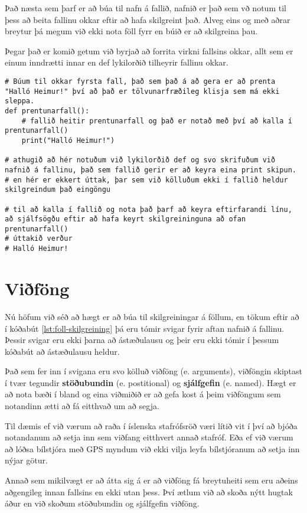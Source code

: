 Það næsta sem þarf er að búa til nafn á fallið, nafnið er það sem vð notum til þess að beita fallinu okkar eftir að hafa skilgreint það.
Alveg eins og með aðrar breytur þá megum við ekki nota föll fyrr en búið er að skilgreina þau.

Þegar það er komið getum við byrjað að forrita virkni fallsins okkar, allt sem er einum inndrætti innar en def lykilorðið tilheyrir fallinu okkar.


\begin{lstlisting}[caption=Föll skilgreind, label=lst:foll-skilgreining]
# Búum til okkar fyrsta fall, það sem það á að gera er að prenta "Halló Heimur!" því að það er tölvunarfræðileg klisja sem má ekki sleppa.
def prentunarfall():
	# fallið heitir prentunarfall og það er notað með því að kalla í prentunarfall()
	print("Halló Heimur!")
	
# athugið að hér notuðum við lykilorðið def og svo skrifuðum við nafnið á fallinu, það sem fallið gerir er að keyra eina print skipun.
# en hér er ekkert úttak, þar sem við kölluðum ekki í fallið heldur skilgreindum það eingöngu

# til að kalla í fallið og nota það þarf að keyra eftirfarandi línu, að sjálfsögðu eftir að hafa keyrt skilgreininguna að ofan
prentunarfall()
# úttakið verður
# Halló Heimur!
\end{lstlisting}
\section{Viðföng}
Nú höfum við séð að hægt er að búa til skilgreiningar á föllum, en tökum eftir að í kóðabút \ref{lst:foll-skilgreining} þá eru tómir svigar fyrir aftan nafnið á fallinu.
Þessir svigar eru ekki þarna að ástæðulausu og þeir eru ekki tómir í þessum kóðabút að ástæðulausu heldur.

Það sem fer inn í svigana eru svo kölluð viðföng (e. arguments), viðföngin skiptast í tvær tegundir \textbf{stöðubundin} (e. postitional) og \textbf{sjálfgefin} (e. named).
Hægt er að nota bæði í bland og eina viðmiðið er að gefa kost á þeim viðföngum sem notandinn ætti að fá eitthvað um að segja.

Til dæmis ef við værum að raða í íslenska stafrófsröð væri lítið vit í því að bjóða notandanum að setja inn sem viðfang eitthvert annað stafróf.
Eða ef við værum að lóðsa bílstjóra með GPS myndum við ekki vilja leyfa bílstjóranum að setja inn nýjar götur.

Annað sem mikilvægt er að átta sig á er að viðföng fá breytuheiti sem eru aðeins aðgengileg innan fallsins en ekki utan þess. Því ætlum við að skoða nýtt hugtak áður en við skoðum stöðubundin og sjálfgefin viðföng.

